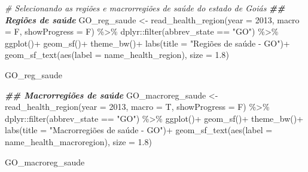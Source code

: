 \documentclass[
  brazilian,
]{book}
\newenvironment{Shaded}{\begin{snugshade}}{\end{snugshade}}
\newcommand{\AttributeTok}[1]{\textcolor[rgb]{0.77,0.63,0.00}{#1}}
\newcommand{\CommentTok}[1]{\textcolor[rgb]{0.56,0.35,0.01}{\textit{#1}}}
\newcommand{\DecValTok}[1]{\textcolor[rgb]{0.00,0.00,0.81}{#1}}
\newcommand{\DocumentationTok}[1]{\textcolor[rgb]{0.56,0.35,0.01}{\textbf{\textit{#1}}}}
\newcommand{\FloatTok}[1]{\textcolor[rgb]{0.00,0.00,0.81}{#1}}
\newcommand{\FunctionTok}[1]{\textcolor[rgb]{0.00,0.00,0.00}{#1}}
\newcommand{\NormalTok}[1]{#1}
\newcommand{\OtherTok}[1]{\textcolor[rgb]{0.56,0.35,0.01}{#1}}
\newcommand{\SpecialCharTok}[1]{\textcolor[rgb]{0.00,0.00,0.00}{#1}}
\newcommand{\StringTok}[1]{\textcolor[rgb]{0.31,0.60,0.02}{#1}}
\begin{document}
\begin{Shaded}
\begin{Highlighting}[]
\CommentTok{\# Selecionando as regiões e macrorregiões de saúde do estado de Goiás}
\DocumentationTok{\#\# Regiões de saúde}
\NormalTok{GO\_reg\_saude }\OtherTok{\textless{}{-}} \FunctionTok{read\_health\_region}\NormalTok{(}\AttributeTok{year =} \DecValTok{2013}\NormalTok{,}
                                   \AttributeTok{macro =}\NormalTok{ F,}
                                   \AttributeTok{showProgress =}\NormalTok{ F) }\SpecialCharTok{\%\textgreater{}\%}
\NormalTok{  dplyr}\SpecialCharTok{::}\FunctionTok{filter}\NormalTok{(abbrev\_state }\SpecialCharTok{==} \StringTok{"GO"}\NormalTok{) }\SpecialCharTok{\%\textgreater{}\%} 
  \FunctionTok{ggplot}\NormalTok{()}\SpecialCharTok{+}
  \FunctionTok{geom\_sf}\NormalTok{()}\SpecialCharTok{+}
  \FunctionTok{theme\_bw}\NormalTok{()}\SpecialCharTok{+}
  \FunctionTok{labs}\NormalTok{(}\AttributeTok{title =} \StringTok{"Regiões de saúde {-} GO"}\NormalTok{)}\SpecialCharTok{+}
  \FunctionTok{geom\_sf\_text}\NormalTok{(}\FunctionTok{aes}\NormalTok{(}\AttributeTok{label =}\NormalTok{ name\_health\_region), }\AttributeTok{size =} \FloatTok{1.8}\NormalTok{)}

\NormalTok{GO\_reg\_saude}
\end{Highlighting}
\end{Shaded}

\begin{Shaded}
\begin{Highlighting}[]
\DocumentationTok{\#\# Macrorregiões de saúde}
\NormalTok{GO\_macroreg\_saude }\OtherTok{\textless{}{-}} \FunctionTok{read\_health\_region}\NormalTok{(}\AttributeTok{year =} \DecValTok{2013}\NormalTok{,}
                                        \AttributeTok{macro =}\NormalTok{ T,}
                                        \AttributeTok{showProgress =}\NormalTok{ F) }\SpecialCharTok{\%\textgreater{}\%}
\NormalTok{  dplyr}\SpecialCharTok{::}\FunctionTok{filter}\NormalTok{(abbrev\_state }\SpecialCharTok{==} \StringTok{"GO"}\NormalTok{) }\SpecialCharTok{\%\textgreater{}\%} 
  \FunctionTok{ggplot}\NormalTok{()}\SpecialCharTok{+}
  \FunctionTok{geom\_sf}\NormalTok{()}\SpecialCharTok{+}
  \FunctionTok{theme\_bw}\NormalTok{()}\SpecialCharTok{+}
  \FunctionTok{labs}\NormalTok{(}\AttributeTok{title =} \StringTok{"Macrorregiões de saúde {-} GO"}\NormalTok{)}\SpecialCharTok{+}
  \FunctionTok{geom\_sf\_text}\NormalTok{(}\FunctionTok{aes}\NormalTok{(}\AttributeTok{label =}\NormalTok{ name\_health\_macroregion), }\AttributeTok{size =} \FloatTok{1.8}\NormalTok{)}

\NormalTok{GO\_macroreg\_saude}
\end{Highlighting}
\end{Shaded}
\end{document}
